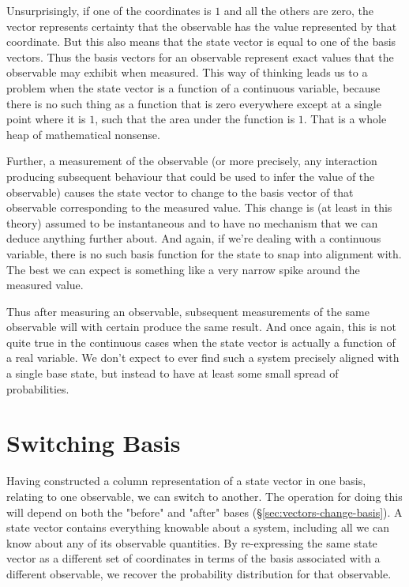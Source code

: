 Unsurprisingly, if one of the coordinates is $1$ and all the others are zero, the vector represents certainty that the observable has the value represented by that coordinate. But this also means that the state vector is equal to one of the basis vectors. Thus the basis vectors for an observable represent exact values that the observable may exhibit when measured. This way of thinking leads us to a problem when the state vector is a function of a continuous variable, because there is no such thing as a function that is zero everywhere except at a single point where it is $1$, such that the area under the function is $1$. That is a whole heap of mathematical nonsense.

Further, a measurement of the observable (or more precisely, any interaction producing subsequent behaviour that could be used to infer the value of the observable) causes the state vector to change to the basis vector of that observable corresponding to the measured value. This change is (at least in this theory) assumed to be instantaneous and to have no mechanism that we can deduce anything further about. And again, if we're dealing with a continuous variable, there is no such basis function for the state to snap into alignment with. The best we can expect is something like a very narrow spike around the measured value.

Thus after measuring an observable, subsequent measurements of the same observable will with certain produce the same result. And once again, this is not quite true in the continuous cases when the state vector is actually a function of a real variable. We don't expect to ever find such a system precisely aligned with a single base state, but instead to have at least some small spread of probabilities.

\section{Switching Basis}

Having constructed a column representation of a state vector in one basis, relating to one observable, we can switch to another. The operation for doing this will depend on both the "before" and "after" bases (§\ref{sec:vectors-change-basis}). A state vector contains everything knowable about a system, including all we can know about any of its observable quantities. By re-expressing the same state vector as a different set of coordinates in terms of the basis associated with a different observable, we recover the probability distribution for that observable.


